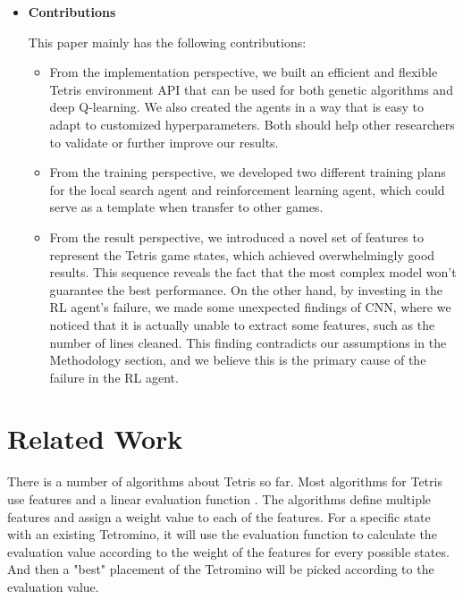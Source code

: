 \documentclass[letterpaper]{article} %
\begin{document}
\begin{itemize}
\item 
{\bf Contributions}

This paper mainly has the following contributions:
\begin{itemize}
  \item 
  From the implementation perspective, we built an efficient and flexible Tetris environment API that can be used for both genetic algorithms and deep Q-learning. We also created the agents in a way that is easy to adapt to customized hyperparameters. Both should help other researchers to validate or further improve our results.
  \item 
  From the training perspective, we developed two different training plans for the local search agent and reinforcement learning agent, which could serve as a template when transfer to other games.
  \item 
  From the result perspective, we introduced a novel set of features to represent the Tetris game states, which achieved overwhelmingly good results. This sequence reveals the fact that the most complex model won't guarantee the best performance. On the other hand, by investing in the RL agent's failure, we made some unexpected findings of CNN, where we noticed that it is actually unable to extract some features, such as the number of lines cleaned. This finding contradicts our assumptions in the Methodology section, and we believe this is the primary cause of the failure in the RL agent.
\end{itemize}


\end{itemize}


\section{Related Work} 

There is a number of algorithms about Tetris so far. Most algorithms for Tetris use features and a linear evaluation function \cite{SO19}. The algorithms define multiple features and assign a weight value to each of the features. For a specific state with an existing Tetromino, it will use the evaluation function to calculate the evaluation value according to the weight of the features for every possible states. And then a "best" placement of the Tetromino will be picked according to the evaluation value.
\end{document}

